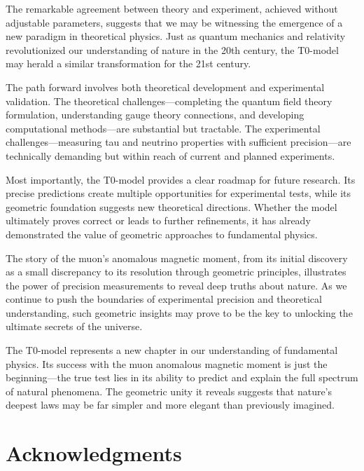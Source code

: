 \documentclass[12pt,a4paper]{article}
\begin{document}
	The remarkable agreement between theory and experiment, achieved without adjustable parameters, suggests that we may be witnessing the emergence of a new paradigm in theoretical physics. Just as quantum mechanics and relativity revolutionized our understanding of nature in the 20th century, the T0-model may herald a similar transformation for the 21st century.
	
	The path forward involves both theoretical development and experimental validation. The theoretical challenges—completing the quantum field theory formulation, understanding gauge theory connections, and developing computational methods—are substantial but tractable. The experimental challenges—measuring tau and neutrino properties with sufficient precision—are technically demanding but within reach of current and planned experiments.
	
	Most importantly, the T0-model provides a clear roadmap for future research. Its precise predictions create multiple opportunities for experimental tests, while its geometric foundation suggests new theoretical directions. Whether the model ultimately proves correct or leads to further refinements, it has already demonstrated the value of geometric approaches to fundamental physics.
	
	The story of the muon's anomalous magnetic moment, from its initial discovery as a small discrepancy to its resolution through geometric principles, illustrates the power of precision measurements to reveal deep truths about nature. As we continue to push the boundaries of experimental precision and theoretical understanding, such geometric insights may prove to be the key to unlocking the ultimate secrets of the universe.
	
	\begin{tcolorbox}[colback=blue!5!white,colframe=blue!75!black,title=Looking Forward]
		The T0-model represents a new chapter in our understanding of fundamental physics. Its success with the muon anomalous magnetic moment is just the beginning—the true test lies in its ability to predict and explain the full spectrum of natural phenomena. The geometric unity it reveals suggests that nature's deepest laws may be far simpler and more elegant than previously imagined.
	\end{tcolorbox}
	
	\section{Acknowledgments}
	
\end{document}
